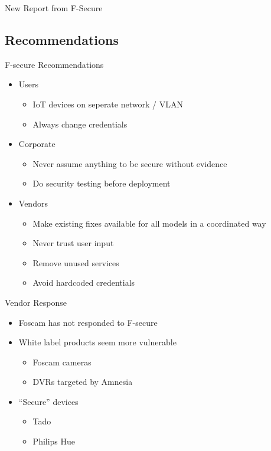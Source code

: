 \begin{frame}{New Report from F-Secure}
\end{frame}

\subsection{Recommendations}
\begin{frame}{F-secure Recommendations}

\begin{itemize}
	\item Users
\begin{itemize}
	\item IoT devices on seperate network / VLAN
	\item Always change credentials
\end{itemize}
	\item Corporate
\begin{itemize}
	\item Never assume anything to be secure without evidence
	\item Do security testing before deployment
\end{itemize}
	\item Vendors
\begin{itemize}
	\item Make existing fixes available for all models in a coordinated way
	\item Never trust user input
	\item Remove unused services
	\item Avoid hardcoded credentials
\end{itemize}
\end{itemize}
	
\end{frame}

\begin{frame}{Vendor Response}
\begin{itemize}
	\item Foscam has not responded to F-secure
	\item White label products seem more vulnerable
	\begin{itemize}
		\item Foscam cameras
		\item DVRs targeted by Amnesia
	\end{itemize}
	\item ``Secure'' devices
	\begin{itemize}
		\item Tado
		\item Philips Hue
	\end{itemize}
\end{itemize}

\end{frame}
